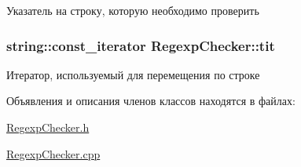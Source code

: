 Указатель на строку, которую необходимо проверить 

\subsubsection[{\texorpdfstring{tit}{tit}}]{\setlength{\rightskip}{0pt plus 5cm}string\+::const\+\_\+iterator Regexp\+Checker\+::tit\hspace{0.3cm}{\ttfamily [private]}}\hypertarget{class_regexp_checker_a782456d19baedddca76f23c3efd8cc53}{}\label{class_regexp_checker_a782456d19baedddca76f23c3efd8cc53}


Итератор, используемый для перемещения по строке 



Объявления и описания членов классов находятся в файлах\+:\begin{DoxyCompactItemize}
\item 
\hyperlink{_regexp_checker_8h}{Regexp\+Checker.\+h}\item 
\hyperlink{_regexp_checker_8cpp}{Regexp\+Checker.\+cpp}\end{DoxyCompactItemize}
